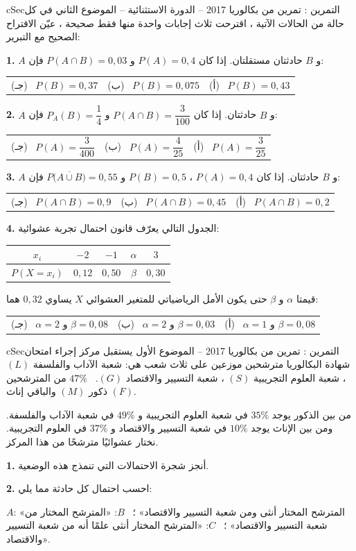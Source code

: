 \documentclass[12pt,a4paper]{article}
\newenvironment{BOX}[2]{\begin{otherlanguage}{english}\begin{arbox}{#1}{#2}}{\end{arbox}\end{otherlanguage}}
\newcounter{exo}
\newenvironment{tamrin}[1]{\stepcounter{exo}\begin{BOX}{cSec}{التمرين \theexo: #1}}{\end{BOX}}
\newenvironment{LTR}{\begin{otherlanguage}{english}}{\end{otherlanguage}}
\newcommand{\QQ}[1]{\par\smallskip\textbf{#1.} }
\newcommand{\ABC}[3]{\\[2pt]\begin{tabular}{p{0.28\textwidth}p{0.28\textwidth}p{0.28\textwidth}}(جـ) \ #3 & (ب) \ #2 & (أ) \ #1\end{tabular}}
\begin{document}
\begin{tamrin}{تمرين من بكالوريا 2017 -- الدورة الاستثنائية -- الموضوع الثاني}
في كل حالة من الحالات الآتية ، اقترحت ثلاث إجابات واحدة منها فقط صحيحة ، عيّن الاقتراح الصحيح مع التبرير:
\QQ{1} $A$ و $B$ حادثتان مستقلتان. إذا كان $P(A)=0{,}4$ و $P(A\cap B)=0{,}03$ فإن: \ABC{$P(B)=0{,}43$}{$P(B)=0{,}075$}{$P(B)=0{,}37$}
\QQ{2} $A$ و $B$ حادثتان. إذا كان $P(A\cap B)=\dfrac3{100}$ و $P_A(B)=\dfrac14$ فإن: \ABC{$P(A)=\dfrac3{25}$}{$P(A)=\dfrac4{25}$}{$P(A)=\dfrac3{400}$}
\QQ{3} $A$ و $B$ حادثتان. إذا كان $P(A)=0{,}4$ ، $P(B)=0{,}5$ و $P\big(\overline{A\cup B}\big)=0{,}55$ فإن: \ABC{$P(A\cap B)=0{,}2$}{$P(A\cap B)=0{,}45$}{$P(A\cap B)=0{,}9$}
\QQ{4} الجدول التالي يعرّف قانون احتمال تجربة عشوائية:
\begin{center}\begin{LTR}\renewcommand{\arraystretch}{1.4}
\begin{tabular}{|c|c|c|c|c|}\hline
\rowcolor{cSec!12}$x_i$ & $-2$ & $-1$ & $\alpha$ & $3$\\\hline
$P(X=x_i)$ & $0{,}12$ & $0{,}50$ & $\beta$ & $0{,}30$\\\hline
\end{tabular}\end{LTR}\end{center}
قيمتا $\alpha$ و $\beta$ حتى يكون الأمل الرياضياتي للمتغير العشوائي $X$ يساوي $0{,}32$ هما: \ABC{$\alpha=1$ و $\beta=0{,}08$}{$\alpha=2$ و $\beta=0{,}03$}{$\alpha=2$ و $\beta=0{,}08$}
\end{tamrin}
\begin{tamrin}{تمرين من بكالوريا 2017 -- الموضوع الأول}
يستقبل مركز إجراء امتحان شهادة البكالوريا مترشحين موزعين على ثلاث شعب هي: شعبة الآداب والفلسفة $(L)$ ، شعبة العلوم التجريبية $(S)$ ، شعبة التسيير والاقتصاد $(G)$. \ $47\%$ من المترشحين ذكور $(M)$ والباقي إناث $(F)$.
\par من بين الذكور يوجد $35\%$ في شعبة العلوم التجريبية و $49\%$ في شعبة الآداب والفلسفة. ومن بين الإناث يوجد $10\%$ في شعبة التسيير والاقتصاد و $37\%$ في العلوم التجريبية. نختار عشوائيًا مترشحًا من هذا المركز.
\QQ{1} أنجز شجرة الاحتمالات التي تنمذج هذه الوضعية.
\QQ{2} احسب احتمال كل حادثة مما يلي:
\par $A$: «المترشح المختار أنثى ومن شعبة التسيير والاقتصاد» ؛ \ $B$: «المترشح المختار من شعبة التسيير والاقتصاد» ؛ \ $C$: «المترشح المختار أنثى علمًا أنه من شعبة التسيير والاقتصاد».
\end{tamrin}
\end{document}
